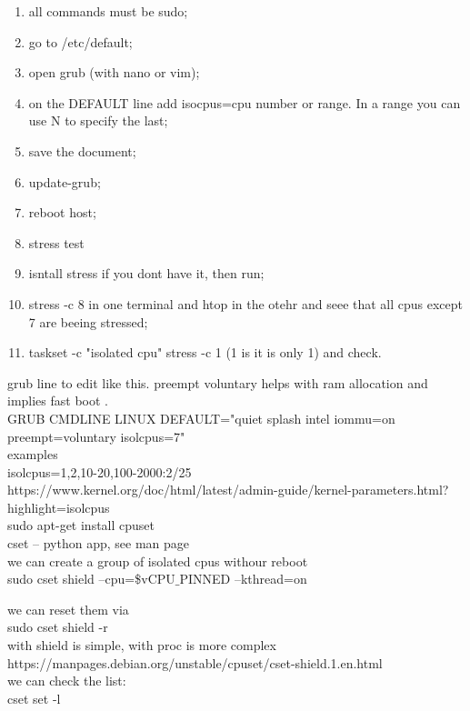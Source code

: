\documentclass[11pt, a4paper, oneside]{article}
\theoremstyle{definition}
\begin{document}
\begin{enumerate}
	\item all commands must be sudo;
	\item go to /etc/default;
	\item open grub (with nano or vim);
	\item on the DEFAULT line add isocpus=cpu number or range. In a range you can use N to specify the last;
	\item save the document;
	\item update-grub;
	\item reboot host;
	\item stress test
		\item isntall stress if you dont have it, then run;
			\item stress -c 8 in one terminal and htop in the otehr and seee that all cpus except 7 are beeing stressed;
			\item taskset -c "isolated cpu" stress -c 1 (1 is it is only 1) and check.
\end{enumerate}

grub line to edit like this. preempt voluntary helps with ram allocation and implies fast boot .\\
GRUB CMDLINE LINUX DEFAULT="quiet splash intel iommu=on preempt=voluntary isolcpus=7"\\

examples\\
isolcpus=1,2,10-20,100-2000:2/25\\

https://www.kernel.org/doc/html/latest/admin-guide/kernel-parameters.html?highlight=isolcpus\\

sudo apt-get install cpuset\\
cset -- python app, see man page\\
we can create a group of isolated cpus withour reboot\\
sudo cset shield --cpu=\${vCPU$\_$PINNED} --kthread=on

we can reset them via \\
sudo cset shield -r\\

with shield is simple, with proc is more complex\\
https://manpages.debian.org/unstable/cpuset/cset-shield.1.en.html\\

we can check the list: \\
cset set -l\\
\end{document}

